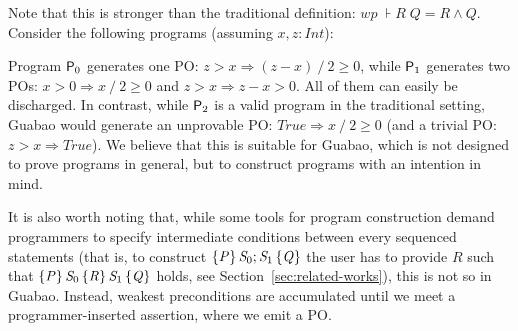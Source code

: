 \documentclass[runningheads]{llncs}
\newcommand{\Conid}[1]{\mathit{#1}}
\newcommand{\Varid}[1]{\mathit{#1}}
\renewcommand{\geq}{\geqslant}
\def\resethooks{%
  \global\let\SaveRestoreHook\empty
  \global\let\ColumnHook\empty}
\let\hspre\empty
\let\hspost\empty
\let\Varid\mathit
\let\Conid\mathit
\newcounter{linenum}
\begin{document}
Note that this is stronger than the traditional definition:
\ensuremath{\Varid{wp}\;\assert{\Conid{R}}\;\Conid{Q}\mathrel{=}\Conid{R}\mathrel{\wedge}\Conid{Q}}.
Consider the following programs (assuming \ensuremath{\Varid{x},\Varid{z}\mathbin{:}\Conid{Int}}):
\resethooks
Program ${\sf P}_0$ generates one PO: \ensuremath{\Varid{z}\mathbin{>}\Varid{x}\mathrel{\Rightarrow}(\Varid{z}\mathbin{-}\Varid{x})\mathbin{/}\mathrm{2}\geq \mathrm{0}}, while ${\sf P}_1$ generates two POs: \ensuremath{\Varid{x}\mathbin{>}\mathrm{0}\mathrel{\Rightarrow}\Varid{x}\mathbin{/}\mathrm{2}\geq \mathrm{0}} and \ensuremath{\Varid{z}\mathbin{>}\Varid{x}\mathrel{\Rightarrow}\Varid{z}\mathbin{-}\Varid{x}\mathbin{>}\mathrm{0}}.
All of them can easily be discharged.
In contrast, while ${\sf P}_2$ is a valid program in the traditional setting, Guabao would generate an unprovable PO: \ensuremath{\Conid{True}\mathrel{\Rightarrow}\Varid{x}\mathbin{/}\mathrm{2}\geq \mathrm{0}} (and a trivial PO: \ensuremath{\Varid{z}\mathbin{>}\Varid{x}\mathrel{\Rightarrow}\Conid{True}}).
We believe that this is suitable for Guabao, which is not designed to prove programs in general, but to construct programs with an intention in mind.

It is also worth noting that, while some tools for program construction demand programmers to specify intermediate conditions between every sequenced statements (that is, to construct \ensuremath{\htriple{\Conid{P}}{\Conid{S}_{0};\Conid{S}_{1}}{\Conid{Q}}} the user has to provide \ensuremath{\Conid{R}} such that \ensuremath{\htripletwo{\Conid{P}}{\Conid{S}_{0}}{\Conid{R}}{\Conid{S}_{1}}{\Conid{Q}}} holds, see Section~\ref{sec:related-works}),
this is not so in Guabao. Instead, weakest preconditions are accumulated until we meet a programmer-inserted assertion, where we emit a PO.
\end{document}
